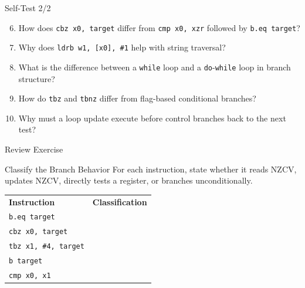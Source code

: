 \documentclass[aspectratio=169,11pt,t]{beamer}
\newcommand{\code}[1]{\texttt{#1}}
\begin{document}



\begin{frame}{Self-Test 2/2}
\begin{enumerate}
\setcounter{enumi}{5}
\item How does \code{cbz x0, target} differ from \code{cmp x0, xzr} followed by \code{b.eq target}?
\item Why does \code{ldrb w1, [x0], \#1} help with string traversal?
\item What is the difference between a \code{while} loop and a \code{do}-\code{while} loop in branch structure?
\item How do \code{tbz} and \code{tbnz} differ from flag-based conditional branches?
\item Why must a loop update execute before control branches back to the next test?
\end{enumerate}
\end{frame}




\begin{frame}{Review Exercise}
\begin{block}{Classify the Branch Behavior}
For each instruction, state whether it reads NZCV, updates NZCV, directly tests a register, or branches unconditionally.
\end{block}
\vspace{0.15cm}
\begin{center}
\small
\renewcommand{\arraystretch}{1.16}
\begin{tabular}{
  >{\raggedright\arraybackslash}m{4.2cm}
  >{\raggedright\arraybackslash}m{6.3cm}
}
\rowcolor{navy}
{\color{white}\bfseries Instruction} &
{\color{white}\bfseries Classification} \\
\rowcolor{softgray}
\code{b.eq target} & \\
\rowcolor{white}
\code{cbz x0, target} & \\
\rowcolor{softgray}
\code{tbz x1, \#4, target} & \\
\rowcolor{white}
\code{b target} & \\
\rowcolor{softgray}
\code{cmp x0, x1} & \\
\end{tabular}
\end{center}
\end{frame}
\end{document}
